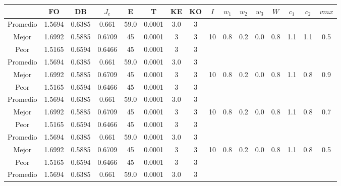 \begin{table}[h!]
    \footnotesize
    \begin{center}
        \begin{tabular}{|c|c|c|c|c|c|c|c|c|c|c|c|c|c|c|c|}
        \hline
            & {\bf FO} & {\bf DB} & $J_e$ & {\bf E} & {\bf T} & {\bf KE} & {\bf KO} & $I$ & $w_1$ & $w_2$ & $w_3$ & $W$ & $c_1$ & $c_2$ & $vmx$ \\
        \hline
        \hline
            Promedio  & 1.5694 & 0.6385 & 0.661 & 59.0 & 0.0001 & 3.0 & 3 &  &  &  &  &  &  &  & \\
            \cline{1-8}
            Mejor & 1.6992 & 0.5885  & 0.6709 & 45 & 0.0001 & 3 & 3 & 10 & 0.8 & 0.2 & 0.0 & 0.8 & 1.1 & 1.1 & 0.5\\
            \cline{1-8}
            Peor & 1.5165 & 0.6594  & 0.6466 & 45 & 0.0001 & 3 & 3 &  &  &  &  &  &  &  & \\
        \hline
        \hline
            Promedio  & 1.5694 & 0.6385 & 0.661 & 59.0 & 0.0001 & 3.0 & 3 &  &  &  &  &  &  &  & \\
            \cline{1-8}
            Mejor & 1.6992 & 0.5885  & 0.6709 & 45 & 0.0001 & 3 & 3 & 10 & 0.8 & 0.2 & 0.0 & 0.8 & 1.1 & 0.8 & 0.9\\
            \cline{1-8}
            Peor & 1.5165 & 0.6594  & 0.6466 & 45 & 0.0001 & 3 & 3 &  &  &  &  &  &  &  & \\
        \hline
        \hline
            Promedio  & 1.5694 & 0.6385 & 0.661 & 59.0 & 0.0001 & 3.0 & 3 &  &  &  &  &  &  &  & \\
            \cline{1-8}
            Mejor & 1.6992 & 0.5885  & 0.6709 & 45 & 0.0001 & 3 & 3 & 10 & 0.8 & 0.2 & 0.0 & 0.8 & 1.1 & 0.8 & 0.7\\
            \cline{1-8}
            Peor & 1.5165 & 0.6594  & 0.6466 & 45 & 0.0001 & 3 & 3 &  &  &  &  &  &  &  & \\
        \hline
        \hline
            Promedio  & 1.5694 & 0.6385 & 0.661 & 59.0 & 0.0001 & 3.0 & 3 &  &  &  &  &  &  &  & \\
            \cline{1-8}
            Mejor & 1.6992 & 0.5885  & 0.6709 & 45 & 0.0001 & 3 & 3 & 10 & 0.8 & 0.2 & 0.0 & 0.8 & 1.1 & 0.8 & 0.5\\
            \cline{1-8}
            Peor & 1.5165 & 0.6594  & 0.6466 & 45 & 0.0001 & 3 & 3 &  &  &  &  &  &  &  & \\
        \hline
        \hline
            Promedio  & 1.5694 & 0.6385 & 0.661 & 59.0 & 0.0001 & 3.0 & 3 &  &  &  &  &  &  &  & \\

\end{tabular}
\end{center}
\end{table}
